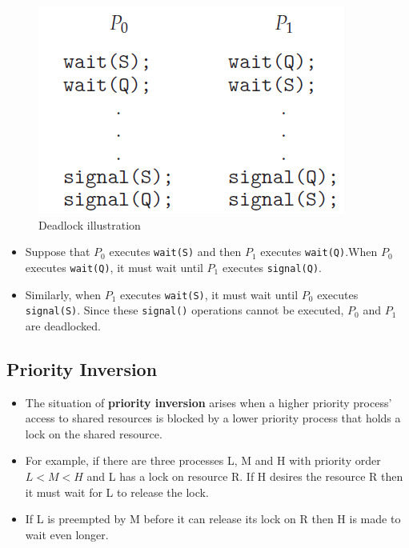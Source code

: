 \documentclass{article}
\theoremstyle{plain}
\theoremstyle{definition}
\begin{document}
\begin{figure}[!ht]
    \centering
    \includegraphics[scale=0.5]{os1.png}
    \caption{Deadlock illustration}
    \label{fig:my_label_1}
\end{figure}

\begin{itemize}
    \item Suppose that $P_0$ executes \texttt{wait(S)} and then $P_1$ executes \texttt{wait(Q)}.When $P_0$ executes \texttt{wait(Q)}, it must wait until $P_1$ executes \texttt{signal(Q)}. 
    
    \item Similarly, when $P_1$ executes \texttt{wait(S)}, it must wait until $P_0$ executes \texttt{signal(S)}. Since these \texttt{signal()} operations cannot be executed, $P_0$ and $P_1$ are deadlocked.
\end{itemize}

\subsection{Priority Inversion}
\begin{itemize}
    \item The situation of \textbf{priority inversion} arises when a higher priority process' access to shared resources is blocked by a lower priority process that holds a lock on the shared resource.
    
    \item For example, if there are three processes L, M and H with priority order $L<M<H$ and L has a lock on resource R. If H desires the resource R then it must wait for L to release the lock. 
    
    \item If L is preempted by M before it can release its lock on R then H is made to wait even longer. 
    
\end{itemize}
\end{document}
